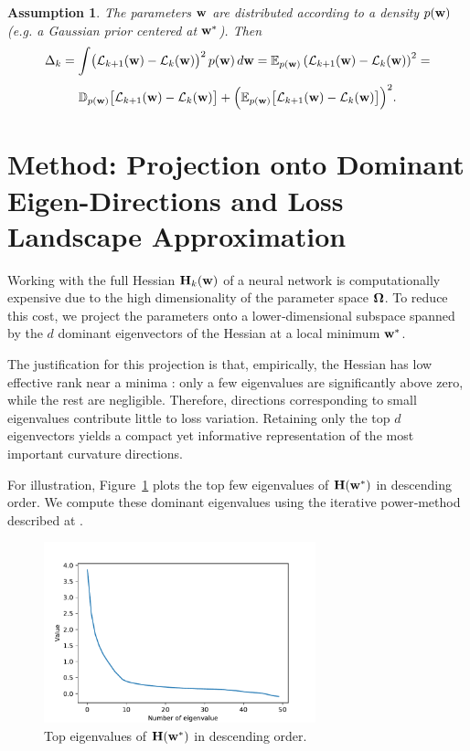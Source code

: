 \documentclass{article}
\newtheorem{assumption}{Assumption}
\begin{document}
\begin{assumption}
  The parameters $\mathbf{w}$ are distributed according to a density $p(\mathbf{w})$ (e.g. a Gaussian prior centered at $\mathbf{w}^*$).  Then
  $$
    \Delta_k =
    \int \bigl(\mathcal{L}_{k+1}(\mathbf{w})-\mathcal{L}_k(\mathbf{w})\bigr)^2\, p(\mathbf{w})\, d\mathbf{w} =
    \mathbb{E}_{p(\mathbf{w})} \left( \mathcal{L}_{k+1}(\mathbf{w}) - \mathcal{L}_{k}(\mathbf{w}) \right)^2 =
  $$
  $$
    \mathbb D_{p(\mathbf{w})} \bigl[ \mathcal{L}_{k+1}(\mathbf{w}) - \mathcal{L}_k(\mathbf{w}) \bigr] +
    \Bigl( \mathbb E_{p(\mathbf{w})} \bigl[ \mathcal{L}_{k+1}(\mathbf{w}) - \mathcal{L}_k(\mathbf{w}) \bigr] \Bigr)^2.
  $$
\end{assumption}


\section{Method: Projection onto Dominant Eigen-Directions and Loss Landscape Approximation}

Working with the full Hessian $\mathbf{H}_k(\mathbf{w})$ of a neural network is computationally expensive due to the high dimensionality
of the parameter space $\boldsymbol{\Omega}$. To reduce this cost, we project the parameters onto a lower‑dimensional subspace spanned by the
$d$ dominant eigenvectors of the Hessian at a local minimum $\mathbf{w}^*$.

The justification for this projection is that, empirically, the Hessian has low effective rank near a minima \cite{sagun2018empirical}:
only a few eigenvalues are significantly above zero, while the rest are negligible.  Therefore, directions corresponding to small
eigenvalues contribute little to loss variation.  Retaining only the top $d$ eigenvectors yields a compact yet informative representation
of the most important curvature directions.

For illustration, Figure~\ref{fig:evgen} plots the top few eigenvalues of $\mathbf{H}(\mathbf{w}^*)$ in descending order. We compute these dominant
eigenvalues using the iterative power‐method described at \cite{hessian-eigenthings}.

\begin{figure}[!htbp]
  \centering
  \includegraphics[width=0.7\textwidth]{img/eigenvalues.pdf}
  \caption{Top eigenvalues of $\mathbf{H}(\mathbf{w}^*)$ in descending order.}
  \label{fig:evgen}
\end{figure}
\end{document}
